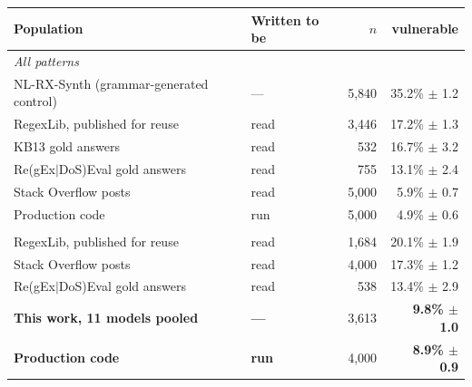 \begin{tabular}{llrr}
\toprule
Population & Written to be & $n$ & vulnerable \\
\midrule
\multicolumn{4}{l}{\emph{All patterns}} \\
NL-RX-Synth (grammar-generated control) & --- & 5{,}840 & 35.2\% $\pm$ 1.2 \\
RegexLib, published for reuse & read & 3{,}446 & 17.2\% $\pm$ 1.3 \\
KB13 gold answers & read & 532 & 16.7\% $\pm$ 3.2 \\
Re(gEx$|$DoS)Eval gold answers & read & 755 & 13.1\% $\pm$ 2.4 \\
Stack Overflow posts & read & 5{,}000 & 5.9\% $\pm$ 0.7 \\
Production code & run & 5{,}000 & 4.9\% $\pm$ 0.6 \\
\addlinespace
\multicolumn{4}{l}{\emph{Anchored \texttt{\^{}...\$} only, controlling for task mix}} \\
RegexLib, published for reuse & read & 1{,}684 & 20.1\% $\pm$ 1.9 \\
Stack Overflow posts & read & 4{,}000 & 17.3\% $\pm$ 1.2 \\
Re(gEx$|$DoS)Eval gold answers & read & 538 & 13.4\% $\pm$ 2.9 \\
\textbf{This work, 11 models pooled} & \textbf{---} & 3{,}613 & \textbf{9.8\% $\pm$ 1.0} \\
\textbf{Production code} & \textbf{run} & 4{,}000 & \textbf{8.9\% $\pm$ 0.9} \\
\bottomrule
\end{tabular}
